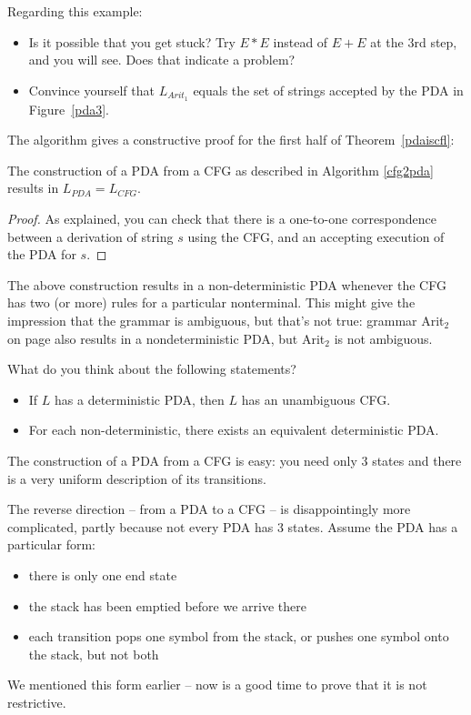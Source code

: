 \begin{exercise}
Regarding this example:
\begin{itemize}
	\item Is it possible that you get stuck? Try $E*E$ instead of $E+E$ at the 3rd
	step, and you will see. Does that indicate a problem?
	\item Convince yourself that $L_{Arit_1}$ equals the set of strings accepted
	by the PDA in Figure~\ref{pda3}.
\end{itemize}
\end{exercise}

The algorithm gives a constructive proof for the first half of Theorem~\ref{pdaiscfl}:
\begin{lemma} \label{equicfgpda1}
The construction of a PDA from a CFG as described in Algorithm \ref{cfg2pda} results in
$L_{PDA} = L_{CFG}$.
\end{lemma}
\begin{proof}
As explained, you can check that there is a one-to-one correspondence between a
derivation of string $s$ using the CFG, and an accepting execution of the PDA for $s$.
\end{proof}

The above construction results in a non-deterministic PDA whenever the
CFG has two (or more) rules for a particular nonterminal. This might
give the impression that the grammar is ambiguous, but that's not true: grammar
Arit${}_2$ on page \pageref{arit2label} also results in a nondeterministic
PDA, but Arit${}_2$ is not ambiguous.

\begin{exercise}
What do you think about the following statements?
\begin{itemize}
	\item If $L$ has a deterministic PDA, then $L$ has an unambiguous CFG.
	\item For each non-deterministic, there exists an equivalent deterministic PDA.
\end{itemize}
\end{exercise}
The construction of a PDA from a CFG is easy: you need only 3
states and there is a very uniform description of its transitions.

The reverse direction -- from a PDA to a CFG -- is disappointingly more
complicated, partly because not every PDA has 3 states. 
Assume the PDA has a particular form:
\begin{itemize}
	\item there is only one end state
	\item the stack has been emptied before we arrive there
	\item each transition pops one symbol from the stack, or pushes one
	  symbol onto the stack, but not both
\end{itemize}
We mentioned this form earlier -- now is a good time to prove that it
is not restrictive.

